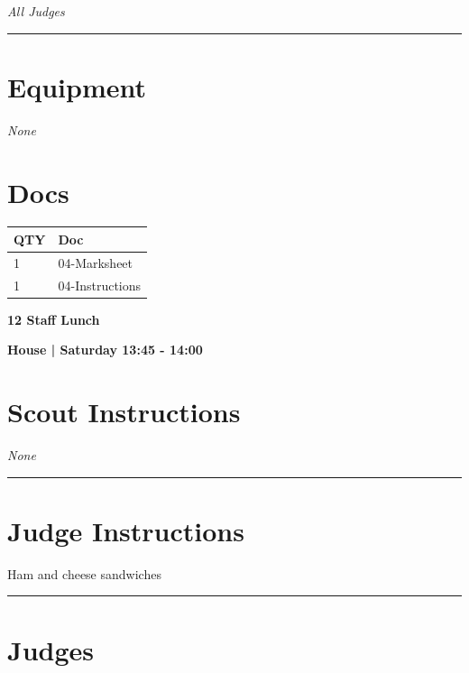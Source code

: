 \documentclass[10pt]{article}
\newcommand{\newtitle}[1]{\begin{center}{\Huge\bfseries #1 }\\ \vspace{5mm}\end{center}}
\newcommand{\newsubtitle}[1]{\begin{center}{\color{grey}\Large\bfseries #1 }\\ \vspace{5mm}\end{center}}
\begin{document}
					\textit{All Judges}
			\vspace{0.5cm}
	\hrule
	\vspace{0.5cm}

	\begin{multicols}{2}

		\section*{\faWrench \: Equipment}

				\textit{None}
		
		\vfill\null
		\columnbreak

			\section*{\faFile \: Docs}
		 	\begin{center}
			\begin{tabular}{p{2cm}p{4cm}}

			\textbf{QTY} & \textbf{Doc} \\\toprule
										1&04-Marksheet\\\midrule
										1&04-Instructions\\\midrule
							\end{tabular}
			\end{center}
	

		\vfill\null

		\end{multicols}



	\vspace{1cm}


	\clearpage
		\newtitle{12 Staff Lunch }
	\newsubtitle{House | Saturday 13:45 - 14:00}
		\setcounter{section}{11}
	\section*{Scout Instructions}
		\textit{None}
	
	\vspace{0.5cm}
	\hrule
	\vspace{0.5cm}

		\section*{Judge Instructions}
		Ham and cheese sandwiches
\vspace{0.5cm}
	\hrule
	\vspace{0.5cm}
		\section*{\faUsers \: Judges}
\end{document}
